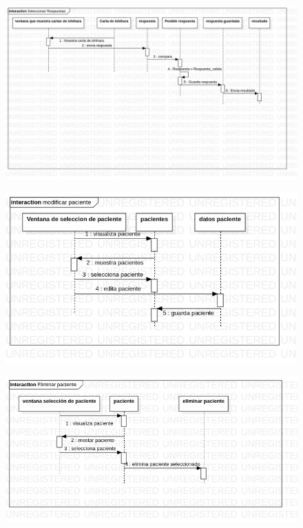 \documentclass[10pt]{article}
\begin{document}
\begin{figure}[H]
	\begin{center}
\includegraphics[scale = 0.40]{UML/s.jpg}
	\end{center} 
\end{figure}


\begin{figure}[H]
	\begin{center}
\includegraphics[scale = 0.65]{UML/Collaboration2!Interaction1!modificar_paciente_6.jpg}
	\end{center} 
\end{figure}

\begin{figure}[H]
	\begin{center}
\includegraphics[scale = 0.60]{UML/Collaboration3!Interaction1!Eliminar_paciente_8.jpg}
	\end{center} 
\end{figure}
\end{document}
